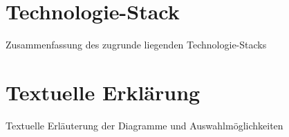 \vspace*{\fill}

\newpage

\section{Technologie-Stack}


Zusammenfassung des zugrunde liegenden Technologie-Stacks

\newpage

\section{Textuelle Erklärung}


Textuelle Erläuterung der Diagramme und Auswahlmöglichkeiten

